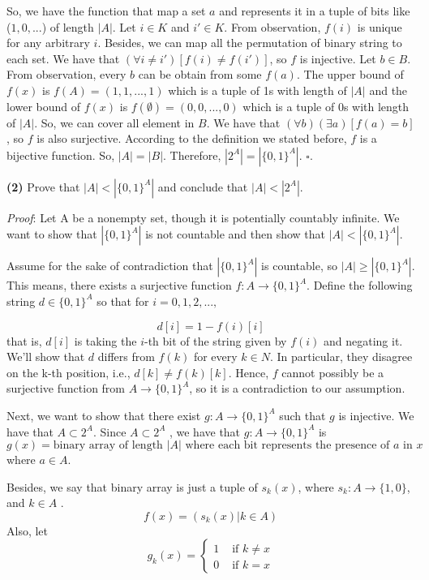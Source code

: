 \documentclass[a4paper, 11pt]{article}
\renewcommand{\part}[1] {\vspace{.10in} {\bf (#1)}}
\begin{document}
	So, we have the function that map a set $a$ and represents it in a tuple of bits like ($1,0,...$) of length $|A|$.
	Let $i \in K$ and $i' \in K$. From observation, $f(i)$ is unique for any arbitrary $i$. Besides, we can map all the permutation of binary string to each set. We have that $ ( \forall i \neq i')[ f(i) \neq f(i')]$, so $f$ is injective. Let $b \in B$. From observation, every $b$ can be obtain from some $f(a)$. The upper bound of $f(x)$ is $f(A) = (1,1,...,1)$ which is a tuple of 1s with length of $|A|$ and the lower bound of $f(x)$ is $f(\emptyset) = (0,0,...,0)$ which is a tuple of 0s with length of $|A|$. So, we can cover all element in $B$.
	We have that $ ( \forall b)( \exists a)[ f(a) = b]$, so $f$ is also surjective. According to the definition we stated before, $f$ is a bijective function. So, $|A| = |B|$. Therefore,  $|2^A| = |\{0, 1\}^A|$. $\square$.
	
	\part{2} Prove that $|A| < |\{0, 1\}^A|$ and conclude that $|A| < |2^A|$.
	
	{\em Proof}: %
	Let A be a nonempty set, though it is potentially countably infinite.
	We want to show that $|\{0, 1\}^A|$ is not countable and then show that $|A| < |\{0, 1\}^A|$.
	
	Assume for the sake of contradiction that $|\{0, 1\}^A|$ is countable, so $|A| \geq |\{0, 1\}^A|$. This means, there exists a
	surjective function $f : A \rightarrow \{0, 1\}^A$. Define the following string $d \in \{0, 1\}^A$ so that for $i = 0, 1, 2, . . . ,$
	
	$$d[i] = 1 - f(i)[i]$$ that is, $d[i]$ is taking the $i$-th bit of the string given by $f(i)$ and negating it. We’ll show that $d$ differs from $f (k)$ for
	every $k \in N$. In particular, they disagree on the k-th position, i.e., $d[k] \neq f(k)[k]$. Hence, $f$ cannot possibly be a
	surjective function from $A \rightarrow \{0, 1\}^A$, so it is a contradiction to our assumption.
	
	Next, we want to show that there exist $g: A \rightarrow \{0, 1\}^A$ such that $g$ is injective. We have that $A \subset 2^A$.  Since  $A \subset 2^A$ , we have that $g: A \rightarrow \{0, 1\}^A$ is
	$$g(x) =  \text{binary array of length $|A|$ where each bit represents the presence of $a$ in $x$}$$
	where $a \in A$.
	
	Besides, we say that binary array is just a tuple of $s_k(x)$, where $s_k: A \rightarrow \{1,0\}$, and $k \in A$ .
	$$f(x) =  (s_k(x) | k \in A)$$
	Also, let 
	$$g_k(x) = \begin{cases} 
	1 & \text{ if $k \neq x$} \\
	0 & \text{ if $k = x$}
	\end{cases} $$
	
\end{document}

